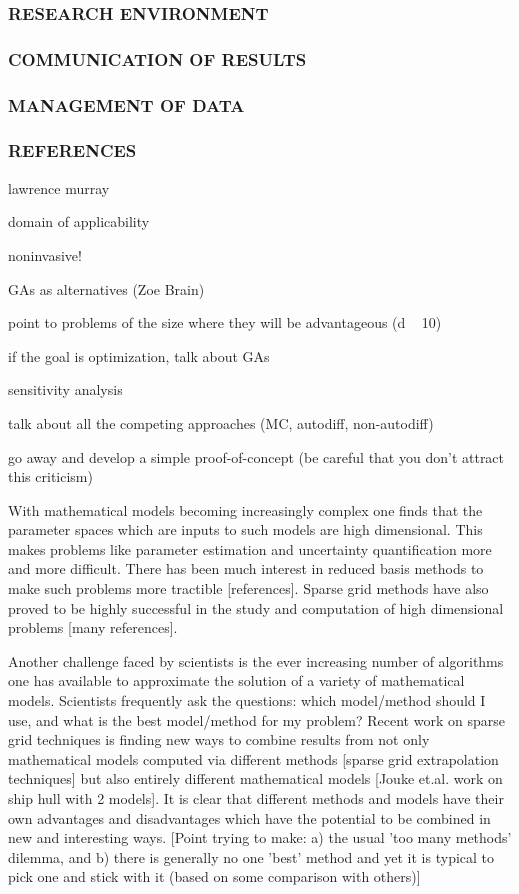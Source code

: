 \documentclass[a4paper,fontsize=12pt]{scrartcl}
\begin{document}
\subsubsection*{RESEARCH ENVIRONMENT}
\subsubsection*{COMMUNICATION OF RESULTS}
\subsubsection*{MANAGEMENT OF DATA}
\subsubsection*{REFERENCES}



lawrence murray

domain of applicability

noninvasive!

GAs as alternatives (Zoe Brain)

point to problems of the size where they will be advantageous (d ~ 10)

if the goal is optimization, talk about GAs

sensitivity analysis

talk about all the competing approaches (MC, autodiff, non-autodiff)

go away and develop a simple proof-of-concept (be careful that you
don't attract this criticism)


With mathematical models becoming increasingly complex one finds that
the parameter spaces which are inputs to such models are high
dimensional. This makes problems like parameter estimation and
uncertainty quantification more and more difficult. There has been
much interest in reduced basis methods to make such problems more
tractible [references]. Sparse grid methods have also proved to be
highly successful in the study and computation of high dimensional
problems [many references].

Another challenge faced by scientists is the ever increasing number of
algorithms one has available to approximate the solution of a variety
of mathematical models. Scientists frequently ask the questions: which
model/method should I use, and what is the best model/method for my
problem? Recent work on sparse grid techniques is finding new ways to
combine results from not only mathematical models computed via
different methods [sparse grid extrapolation techniques] but also
entirely different mathematical models [Jouke et.al. work on ship hull
with 2 models]. It is clear that different methods and models have
their own advantages and disadvantages which have the potential to be
combined in new and interesting ways. [Point trying to make: a) the
usual 'too many methods' dilemma, and b) there is generally no one
'best' method and yet it is typical to pick one and stick with it
(based on some comparison with others)]
\end{document}
